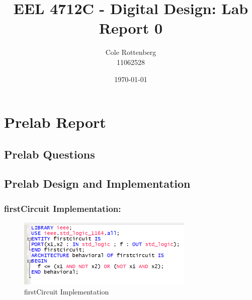 \documentclass{article}
\title{EEL 4712C - Digital Design: Lab Report 0}
\author{Cole Rottenberg \\ 11062528}
\date{\today}
\begin{document}
\maketitle

\section*{Prelab Report}

\subsection*{Prelab Questions}

\subsection*{Prelab Design and Implementation}
\subsubsection*{firstCircuit Implementation:}
\begin{figure}[h]
  \centering
  \includegraphics[width=0.75\textwidth]{code.png}
  \caption{firstCircuit Implementation}
\end{figure}
\end{document}
